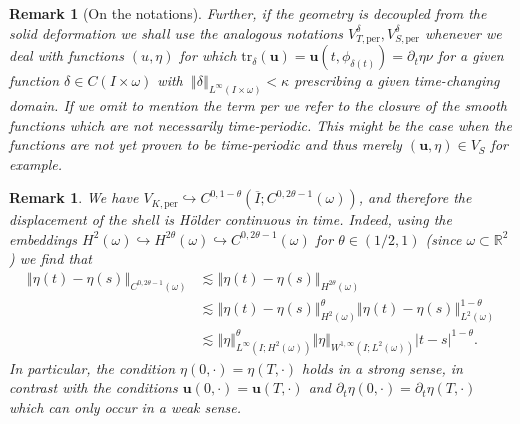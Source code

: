 \documentclass[10pt,a4paper]{article}
\newtheorem{remark}[theorem]{Remark}
\newcommand{\norm}[1]{{\left\Vert{#1}\right\Vert}}
\numberwithin{equation}{section}
\begin{document}
\begin{remark}[On the notations]
Further, if the geometry is {\em decoupled} from the solid deformation we shall use the analogous notations $V_{T,\text{per}}^{\delta},V_{S,\text{per}}^{\delta}$  whenever we deal with functions $(u, \eta)$ for which 
$
\text{tr}_{\delta}(\mathbf{u})=\mathbf{u}\left(t,\phi_{\delta(t)}\right)=\partial_{t}\eta\nu $ for a given function $\delta\in C\left(I\times\omega\right)$ with $\ \left\Vert \delta\right\Vert _{L^{\infty}\left(I\times\omega\right)}<\kappa$ prescribing a given time-changing domain.
If we omit to mention the term \emph{per} we refer to the closure of the  smooth functions which are not necessarily time-periodic. This might be the case when the functions are not yet proven to be time-periodic and thus merely $\left(\mathbf{u},\eta\right)\in V_{S}$ for example. 
\end{remark}
\begin{remark} \label{remark: Holder-cont}
We have $V_{K,\text{per}}\hookrightarrow C^{0,1-\theta}\left(\overline{I};C^{0,2\theta-1}\left(\omega\right)\right)$, and therefore  the displacement of the shell is H\"{o}lder continuous in time.
 Indeed, using the embeddings $H^{2}\left(\omega\right)\hookrightarrow H^{2\theta}\left(\omega\right)\hookrightarrow C^{0,2\theta-1}\left(\omega\right)$ for $\theta \in (1/2,1)$  (since $\omega\subset \mathbb{R}^2$) we find that
\begin{align*}\left\Vert \eta\left(t\right)-\eta\left(s\right)\right\Vert _{C^{0,2\theta-1}\left(\omega\right)} & \lesssim \norm{\eta\left(t\right)-\eta\left(s\right)}_{H^{2\theta}(\omega)}\\
 & \lesssim \left\Vert \eta\left(t\right)-\eta\left(s\right)\right\Vert _{H^{2}\left(\omega\right)}^{\theta}\left\Vert \eta\left(t\right)-\eta\left(s\right)\right\Vert _{L^{2}\left(\omega\right)}^{1-\theta}\\
 & \lesssim\left\Vert \eta\right\Vert _{L^{\infty}\left(I;H^{2}\left(\omega\right)\right)}^{\theta}\left\Vert \eta\right\Vert _{W^{1,\infty}\left(I;L^{2}\left(\omega\right)\right)}\left|t-s\right|^{1-\theta}.
\end{align*}
In particular, the condition $\eta(0,\cdot)=\eta(T,\cdot)$   holds in a strong sense, in contrast with   the  conditions  $\mathbf{u}(0,\cdot)=\mathbf{u}(T,\cdot)$ and $\partial_{t} \eta(0,\cdot)=\partial_{t} \eta (T,\cdot)$ which  can only occur in a weak  sense.
\end{remark}
\end{document}
